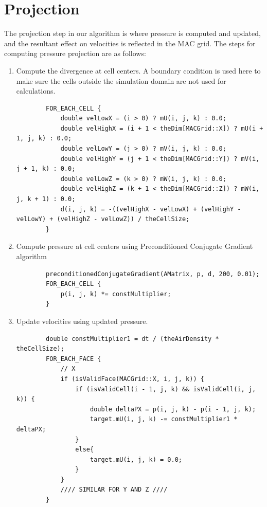 \documentclass[a4paper,11pt]{article}
\theoremstyle{mytheor}
\begin{document}
\section*{Projection}

The projection step in our algorithm is where pressure is computed and updated, and the resultant effect on velocities is reflected in the MAC grid. The steps for computing pressure projection are as follows:

\begin{enumerate}
    \item Compute the divergence at cell centers. A boundary condition is used here to make sure the cells outside the simulation domain are not used for calculations.
        \tiny
        \begin{verbatim}
        FOR_EACH_CELL {
            double velLowX = (i > 0) ? mU(i, j, k) : 0.0;
            double velHighX = (i + 1 < theDim[MACGrid::X]) ? mU(i + 1, j, k) : 0.0;
            double velLowY = (j > 0) ? mV(i, j, k) : 0.0;
            double velHighY = (j + 1 < theDim[MACGrid::Y]) ? mV(i, j + 1, k) : 0.0;
            double velLowZ = (k > 0) ? mW(i, j, k) : 0.0;
            double velHighZ = (k + 1 < theDim[MACGrid::Z]) ? mW(i, j, k + 1) : 0.0;
            d(i, j, k) = -((velHighX - velLowX) + (velHighY - velLowY) + (velHighZ - velLowZ)) / theCellSize;
        }
        \end{verbatim}
        \normalsize
    \item Compute pressure at cell centers using Preconditioned Conjugate Gradient algorithm
        \tiny
        \begin{verbatim}
        preconditionedConjugateGradient(AMatrix, p, d, 200, 0.01);
        FOR_EACH_CELL {
            p(i, j, k) *= constMultiplier;
        }
        \end{verbatim}
        \normalsize
    \item Update velocities using updated pressure.
        \tiny
        \begin{verbatim}
        double constMultiplier1 = dt / (theAirDensity * theCellSize);
        FOR_EACH_FACE {
            // X
            if (isValidFace(MACGrid::X, i, j, k)) {
                if (isValidCell(i - 1, j, k) && isValidCell(i, j, k)) {
                    double deltaPX = p(i, j, k) - p(i - 1, j, k);
                    target.mU(i, j, k) -= constMultiplier1 * deltaPX;
                }
                else{
                    target.mU(i, j, k) = 0.0;
                }
            }
            //// SIMILAR FOR Y AND Z ////
        }
        \end{verbatim}
        \normalsize
        
\end{enumerate}
\end{document}
